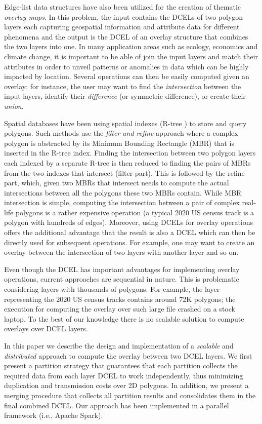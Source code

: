 Edge-list data structures have also been utilized for the creation of thematic \textit{overlay maps}. In this problem, the input contains the DCELs of two
polygon layers each capturing geospatial information and attribute data for different phenomena and the output is the DCEL of an overlay structure that combines
the two layers into one.
In many application areas such as ecology, economics and climate change, it is important to be able of join the input layers and match their attributes in order
to unveil patterns or anomalies in data which can be highly impacted by location.
Several operations can then be easily computed given an overlay; for instance, the user may want to find the \textit{intersection} between the input layers,
identify their \textit{difference} (or symmetric difference), or create their \textit{union}.

Spatial databases have been using spatial indexes (R-tree \cite{guttman_r-trees_1984, beckmann_r-tree_1990}) to store and query polygons. Such methods use the \textit{filter and refine}
approach where a complex polygon is abstracted by its Minimum Bounding Rectangle (MBR) that is inserted in the R-tree index.
Finding the intersection between two polygon layers each indexed by a separate R-tree is then reduced to finding the pairs of MBRs from the two indexes that
intersect (filter part).
This is followed by the refine part, which, given two MBRs that intersect needs to compute the actual intersections between all the polygons these two MBRs
contain.
While MBR intersection is simple, computing the intersection between a pair of complex real-life polygons is a rather expensive operation (a typical 2020 US
census track is a polygon with hundreds of edges).
Moreover, using DCELs for overlay operations offers the additional advantage that the result is also a DCEL which can then be directly used for subsequent
operations.
For example, one may want to create an overlay between the intersection of two layers with another layer and so on.

Even though the DCEL has important advantages for implementing overlay operations, current approaches are sequential in nature.
This is problematic considering layers with thousands of polygons. For example, the layer representing the 2020 US census tracks contains around 72K polygons;
the execution for computing the overlay over such large file crashed on a stock laptop. To the best of our knowledge there is no scalable solution to compute
overlays over DCEL layers.

In this paper we describe the design and implementation of a \textit{scalable} and \textit{distributed} approach to compute the overlay between two DCEL layers.
We first present a partition strategy that guarantees that each partition collects the required data from each layer DCEL to work independently, thus minimizing
duplication and transmission costs over 2D polygons.
In addition, we present a merging procedure that collects all partition results and consolidates them in the final combined DCEL.
Our approach has been implemented in a parallel framework (i.e., Apache Spark).

